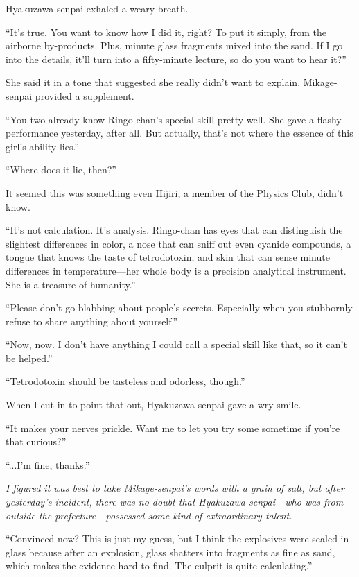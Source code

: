 \documentclass[
    a4paper,
    12pt,
    twoside,
    openany,
    UTF8,
    fontset=windows
]{ctexbook}
\begin{document}
Hyakuzawa-senpai exhaled a weary breath.

``It's true. You want to know how I did it, right? To put it simply, from the airborne by-products. Plus, minute glass fragments mixed into the sand. If I go into the details, it'll turn into a fifty-minute lecture, so do you want to hear it?''

She said it in a tone that suggested she really didn't want to explain. Mikage-senpai provided a supplement.

``You two already know Ringo-chan's special skill pretty well. She gave a flashy performance yesterday, after all. But actually, that's not where the essence of this girl's ability lies.''

``Where does it lie, then?''

It seemed this was something even Hijiri, a member of the Physics Club, didn't know.

``It's not calculation. It's analysis. Ringo-chan has eyes that can distinguish the slightest differences in color, a nose that can sniff out even cyanide compounds, a tongue that knows the taste of tetrodotoxin, and skin that can sense minute differences in temperature---her whole body is a precision analytical instrument. She is a treasure of humanity.''

``Please don't go blabbing about people's secrets. Especially when you stubbornly refuse to share anything about yourself.''

``Now, now. I don't have anything I could call a special skill like that, so it can't be helped.''

``Tetrodotoxin should be tasteless and odorless, though.''

When I cut in to point that out, Hyakuzawa-senpai gave a wry smile.

``It makes your nerves prickle. Want me to let you try some sometime if you're that curious?''

``...I'm fine, thanks.''

\textit{I figured it was best to take Mikage-senpai's words with a grain of salt, but after yesterday's incident, there was no doubt that Hyakuzawa-senpai---who was from outside the prefecture---possessed some kind of extraordinary talent.}

``Convinced now? This is just my guess, but I think the explosives were sealed in glass because after an explosion, glass shatters into fragments as fine as sand, which makes the evidence hard to find. The culprit is quite calculating.''
\end{document}
